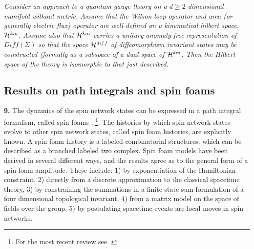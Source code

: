 \documentclass[12pt]{article}
\begin{document}
{\it Consider an
approach to a quantum gauge theory on a $d \geq 2$ dimensional 
manifold without metric. Assume that the Wilson loop 
operator and area (or generally electric flux) operator are well defined on a kinematical
 hilbert space,  ${\cal H}^{\it kin}$. Assume also that ${\cal H}^{\it kin}$ 
carries a unitary anomaly free representation
of $Diff(\Sigma )$ so that the space ${\cal H}^{diff}$ of diffeomorphism 
invariant states may be constructed (formally as a subspace of a dual space of  ${\cal H}^{\it kin}$. 
Then the Hilbert space of the theory is isomorphic to that just described. }
  
  \subsection{Results on path integrals and spin foams}
  
  {\bf 9.}  The dynamics of the spin network states can be expressed
  in a path integral formalism, called
  spin foams\cite{baezfoam}-\cite{alejandro-review},\cite{F-foam}-\cite{BC}\footnote{For the most 
  recent review see \cite{alejandro-review}.}.
  The histories by which spin network
  states evolve to other spin network states, called spin foam
  histories,  are explicitly known.
  A spin foam history is a labeled combinatorial
  structures, which can be described as a branched labeled two complex.
Spin foam models have
  been derived in  several different ways, and the results
  agree as to the general form of a spin foam amplitude. These
include: 1) by exponentiation of the Hamiltonian
  constraint, 2) directly from a discrete approximation
  to the classical spacetime theory, 3)  by constraining the
  summations in a finite state sum formulation of a four dimensional
  topological invariant, 4) from a matrix model on the space of
  fields over the group, 5) by postulating spacetime events are local
  moves in spin networks.
\end{document}
